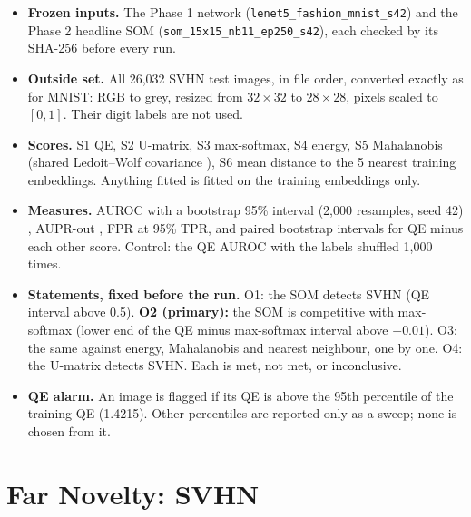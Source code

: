 \documentclass[11pt]{article}
\begin{document}
\begin{itemize}[leftmargin=1.4em, itemsep=2pt]
\item \textbf{Frozen inputs.} The Phase 1 network (\texttt{lenet5\_fashion\_mnist\_s42}) and the Phase 2 headline SOM (\texttt{som\_15x15\_nb11\_ep250\_s42}), each checked by its SHA-256 before every run.
\item \textbf{Outside set.} All 26,032 SVHN test images, in file order, converted exactly as for MNIST: RGB to grey, resized from $32\times32$ to $28\times28$, pixels scaled to $[0,1]$. Their digit labels are not used.
\item \textbf{Scores.} S1 QE, S2 U-matrix, S3 max-softmax, S4 energy, S5 Mahalanobis (shared Ledoit--Wolf covariance \cite{ledoit2004wellconditioned}), S6 mean distance to the 5 nearest training embeddings. Anything fitted is fitted on the training embeddings only.
\item \textbf{Measures.} AUROC with a bootstrap 95\% interval (2,000 resamples, seed 42) \cite{fawcett2006roc}, AUPR-out \cite{saito2015pr}, FPR at 95\% TPR, and paired bootstrap intervals for QE minus each other score. Control: the QE AUROC with the labels shuffled 1,000 times.
\item \textbf{Statements, fixed before the run.} O1: the SOM detects SVHN (QE interval above 0.5). \textbf{O2 (primary):} the SOM is competitive with max-softmax (lower end of the QE minus max-softmax interval above $-0.01$). O3: the same against energy, Mahalanobis and nearest neighbour, one by one. O4: the U-matrix detects SVHN. Each is met, not met, or inconclusive.
\item \textbf{QE alarm.} An image is flagged if its QE is above the 95th percentile of the training QE (1.4215). Other percentiles are reported only as a sweep; none is chosen from it.
\end{itemize}

\section{Far Novelty: SVHN}\label{sec:far}
\end{document}
